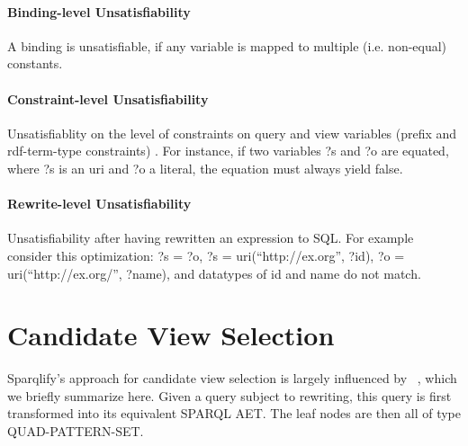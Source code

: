 \documentclass[a4paper,twoside,bibtotoc,abstracton,12pt,BCOR=15mm]{scrreprt}
\begin{document}
\paragraph{Binding-level Unsatisfiability}
A binding is unsatisfiable, if any variable is mapped to multiple (i.e. non-equal) constants.

\paragraph{Constraint-level Unsatisfiability}
Unsatisfiablity on the level of constraints on query and view variables (prefix and rdf-term-type constraints) .
For instance, if two variables ?s and ?o are equated, where ?s is an uri and ?o a literal, the equation must always yield false.

\paragraph{Rewrite-level Unsatisfiability}
Unsatisfiability after having rewritten an expression to SQL.
For example consider this optimization: ?s = ?o, ?s = uri(``http://ex.org'', ?id), ?o = uri(``http://ex.org/'', ?name), and datatypes of
 id and name do not match. 



\section{Candidate View Selection}
Sparqlify's approach for candidate view selection is largely influenced by ~\cite{rewriting-queries-on-sparql-views}, which we briefly summarize here.
Given a query subject to rewriting, this query is first transformed into its equivalent SPARQL AET.
The leaf nodes are then all of type QUAD-PATTERN-SET.
\end{document}
